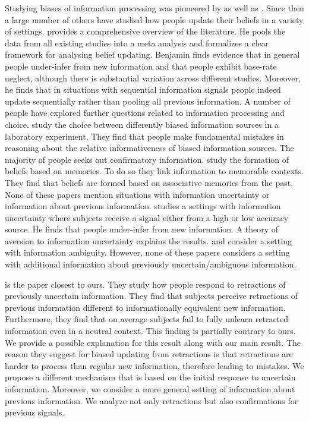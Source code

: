 \documentclass{article}
\begin{document}
Studying biases of information processing was pioneered by \cite{Phillips1966} as well as \cite{Tversky1971, Tversky1974}. Since then a large number of others have studied how people update their beliefs in a variety of settings. \cite{Benjamin2019} provides a comprehensive overview of the literature. He pools the data from all existing studies into a meta analysis and formalizes a clear framework for analysing belief updating. Benjamin finds evidence that in general people under-infer from new information and that people exhibit base-rate neglect, although there is substantial variation across different studies. Moreover, he finds that in situations with sequential information signals people indeed update sequentially rather than pooling all previous information. A number of people have explored further questions related to information processing and choice. \cite{Charness2021} study the choice between differently biased information sources in a laboratory experiment. They find that people make fundamental mistakes in reasoning about the relative informativeness of biased information sources. The majority of people seeks out confirmatory information. \cite{Enke2020} study the formation of beliefs based on memories. To do so they link information to memorable contexts. They find that beliefs are formed based on associative memories from the past. None of these papers mention situations with information uncertainty or information about previous information. \cite{Liang2020} studies a settings with information uncertainty where subjects receive a signal either from a high or low accuracy source. He finds that people under-infer from new information. A theory of aversion to information uncertainty explains the results. \cite{Epstein2021} and \cite{Shishkin2021} consider a setting with information ambiguity. However, none of these papers considers a setting with additional information about previously uncertain/ambiguous information.

\cite{Goncalves2022} is the paper closest to ours. They study how people respond to retractions of previously uncertain information. They find that subjects perceive retractions of previous information different to informationally equivalent new information. Furthermore, they find that on average subjects fail to fully unlearn retracted information even in a neutral context. This finding is partially contrary to ours. We provide a possible explanation for this result along with our main result. The reason they suggest for biased updating from retractions is that retractions are harder to process than regular new information, therefore leading to mistakes. We propose a different mechanism that is based on the initial response to uncertain information. Moreover, we consider a more general setting of information about previous information. We analyze not only retractions but also confirmations for previous signals.
\end{document}
